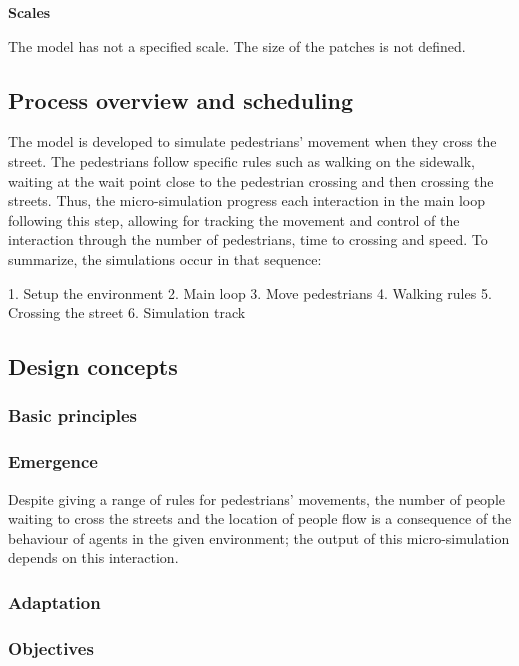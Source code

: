 \documentclass[10pt]{report}
\numberwithin{figure}{section}
\numberwithin{table}{section}
\begin{document}
\newpage

\textbf{Scales}

The model has not a specified scale. The size of the patches is not defined.

\subsection{Process overview and scheduling}


The model is developed to simulate pedestrians' movement when they cross the street. The pedestrians follow specific rules such as walking on the sidewalk, waiting at the wait point close to the pedestrian crossing and then crossing the streets. Thus, the micro-simulation progress each interaction in the main loop following this step, allowing for tracking the movement and control of the interaction through the number of pedestrians, time to crossing and speed. To summarize, the simulations occur in that sequence:

1. Setup the environment
2. Main loop
3. Move pedestrians
4. Walking rules
5. Crossing the street
6. Simulation track


\subsection{Design concepts}

\subsubsection{Basic principles}

\subsubsection{Emergence}
 Despite giving a range of rules for pedestrians' movements, the number of people waiting to cross the streets and the location of people flow is a consequence of the behaviour of agents in the given environment; the output of this micro-simulation depends on this interaction. 
 
\subsubsection{Adaptation}

\subsubsection{Objectives}
\end{document}
